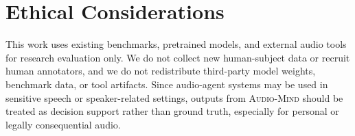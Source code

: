 \documentclass[11pt]{article}
\newcommand{\ours}{\textsc{Audio-Mind}}
\begin{document}
\section*{Ethical Considerations}

This work uses existing benchmarks, pretrained models, and external audio tools for research evaluation only. We do not collect new human-subject data or recruit human annotators, and we do not redistribute third-party model weights, benchmark data, or tool artifacts. Since audio-agent systems may be used in sensitive speech or speaker-related settings, outputs from \ours{} should be treated as decision support rather than ground truth, especially for personal or legally consequential audio.



%


\appendix
\end{document}
